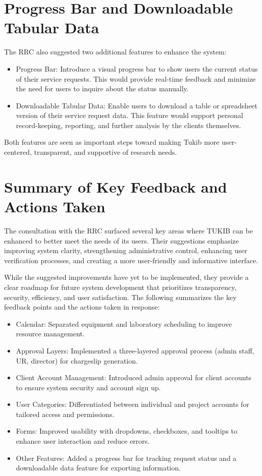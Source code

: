 \section{Progress Bar and Downloadable Tabular Data}
The RRC also suggested two additional features to enhance the system:

\begin{itemize}
	\item Progress Bar: Introduce a visual progress bar to show users the current status of their service requests. This would provide real-time feedback and minimize the need for users to inquire about the status manually.
	\item Downloadable Tabular Data: Enable users to download a table or spreadsheet version of their service request data. This feature would support personal record-keeping, reporting, and further analysis by the clients themselves.
\end{itemize}

Both features are seen as important steps toward making Tukib more user-centered, transparent, and supportive of research needs.

\section{Summary of Key Feedback and Actions Taken}
The consultation with the RRC surfaced several key areas where TUKIB can be enhanced to better meet the needs of its users. Their suggestions emphasize improving system clarity, strengthening administrative control, enhancing user verification processes, and creating a more user-friendly and informative interface.

While the suggested improvements have yet to be implemented, they provide a clear roadmap for future system development that prioritizes transparency, security, efficiency, and user satisfaction. The following summarizes the key feedback points and the actions taken in response:

\begin{itemize}
	\item Calendar: Separated equipment and laboratory scheduling to improve resource management.
	\item Approval Layers: Implemented a three-layered approval process (admin staff, UR, director) for chargeslip generation.
	\item Client Account Management: Introduced admin approval for client accounts to ensure system security and account sign up.
	\item User Categories: Differentiated between individual and project accounts for tailored access and permissions.
	\item Forms: Improved usability with dropdowns, checkboxes, and tooltips to enhance user interaction and reduce errors.
	\item Other Features: Added a progress bar for tracking request status and a downloadable data feature for exporting information.
\end{itemize}


